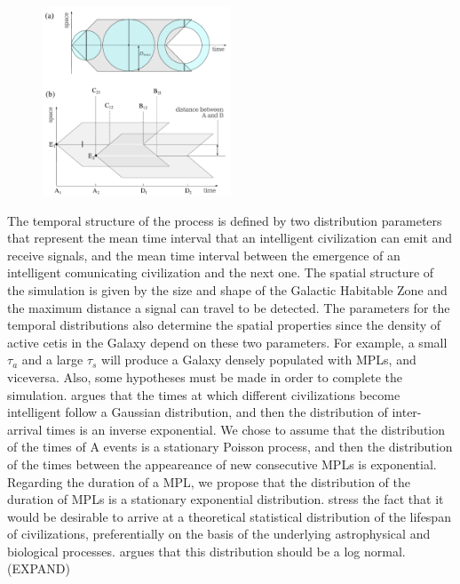 \begin{figure}
   \centering
   \includegraphics[width=0.5\textwidth]{scheme.pdf}
    \label{F_scheme}
\end{figure}

The temporal structure of the process is defined by two distribution
parameters that represent the mean time interval that an intelligent
civilization can emit and receive signals, and the mean time interval
between the emergence of an intelligent comunicating civilization and
the next one.
%
The spatial structure of the simulation is given by the size and shape
of the Galactic Habitable Zone and the maximum distance a signal can
travel to be detected.
%
The parameters for the temporal distributions also determine the
spatial properties since the density of active cetis in the Galaxy
depend on these two parameters.
%
For example, a small $\tau_a$ and a large $\tau_s$ will produce a
Galaxy densely populated with MPLs, and viceversa.
%
Also, some hypotheses must be made in order to complete the
simulation.
%
\citet{forgan_spatiotemporal_2011} argues that the times at which
different civilizations become intelligent 
follow a Gaussian distribution, and then the distribution of
inter-arrival times is an inverse exponential.
%
We chose to assume that the distribution of the times of A events is a
stationary Poisson process, and then the distribution of the times between the
appeareance of new consecutive MPLs is exponential.
%
Regarding the duration of a MPL, we propose that the distribution of
the duration of MPLs is a stationary exponential distribution.
%
\citet{balbi_impact_2018} stress the fact that it would be desirable to arrive
at a theoretical statistical distribution of the lifespan of
civilizations, preferentially on the basis of the underlying
astrophysical and biological processes.
%
\citet{maccone_lognormals_2014} argues that this distribution should be a log normal.
(EXPAND)



